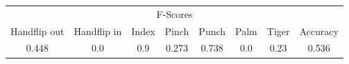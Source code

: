 \documentclass{standalone}
\begin{document}
 
 \begin{tabular}{|c|c|c|c|c|c|c ||c|}
\cline{1-8}\multicolumn{8}{|c|}{F-Scores} \\ 
\cline{1-8}Handflip out & Handflip in & Index & Pinch & Punch & Palm & Tiger & Accuracy\\ 
\cline{1-8}0.448 & 0.0 & 0.9 & 0.273 & 0.738 & 0.0 & 0.23 & 0.536\\ 
 \cline{1-8}\hline \end{tabular}
 
\end{document}
